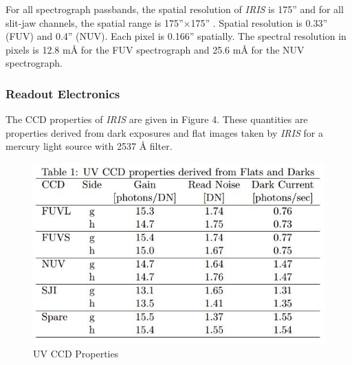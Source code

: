 \documentclass[10pt,a4paper,titlepage]{article}
\begin{document}
			For all spectrograph passbands, the spatial resolution of \textit{IRIS} is 175'' and for all slit-jaw channels, the spatial range is 175''$\times$175'' \cite{ITN1}. Spatial resolution is 0.33'' (FUV) and 0.4'' (NUV). Each pixel is 0.166'' spatially. The spectral resolution in pixels is 12.8 m{\AA} for the FUV spectrograph and 25.6 m{\AA} for the NUV spectrograph.
			
			\subsubsection{Readout Electronics}
			The CCD properties of \textit{IRIS} are given in Figure 4. These quantities are properties derived from dark exposures and flat images taken by \textit{IRIS} for a mercury light source with 2537 {\AA} filter.\\
			
				\begin{figure}[H]
					\includegraphics[scale=0.6]{gaintable}
					\centering
					\caption{UV CCD Properties \cite{ITN25}}
					\centering
				\end{figure}
			
\end{document}
